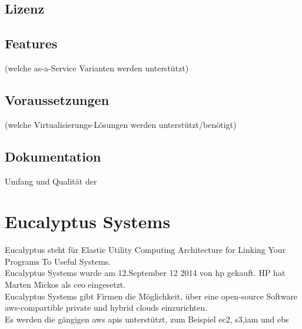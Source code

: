 \documentclass[a4paper,nochapterprefix,english,12pt]{scrreprt}
\begin{document}
\section{Lizenz}
\section{Features}
(welche as-a-Service Varianten werden unterstützt)
\section{Voraussetzungen}
(welche Virtualisierungs-Lösungen werden unterstützt/benötigt)
\section{Dokumentation}
Umfang und Qualität der

\chapter{Eucalyptus Systems} \thispagestyle{fancy}
Eucalyptus steht für Elastic Utility Computing Architecture for Linking Your Programs To Useful Systems. \cite{EucalyptusSlideShare}\\
Eucalyptus Systems wurde am 12.September 12 2014 von \gls{hp} gekauft. \cite{eucHP2}
HP hat Marten Mickos als \gls{ceo} eingesetzt. \cite{eucHP1}
\\
Eucalyptus Systems gibt Firmen die Möglichkeit, über eine open-source Software \gls{aws}-compartible private und hybrid clouds einzurichten. \\
Es werden die gängigen \gls{aws} \gls{api}s unterstützt, zum Beispiel \gls{ec2}, \gls{s3},\gls{iam} und \gls{ebs}
\cite{eucHP2}
\end{document}
